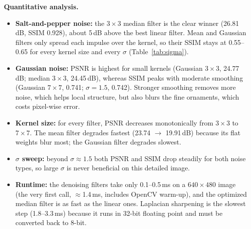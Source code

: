 \documentclass[a4paper,12pt]{article}
\begin{document}
\textbf{Quantitative analysis.}
\begin{itemize}[leftmargin=*]
    \item \textbf{Salt-and-pepper noise:} the $3\times3$ median filter is the clear winner
          (26.81\,dB, SSIM 0.928), about 5\,dB above the best linear filter. Mean and Gaussian
          filters only spread each impulse over the kernel, so their SSIM stays at 0.55--0.65 for
          every kernel size and every $\sigma$ (Table~\ref{tab:sigma}).
    \item \textbf{Gaussian noise:} PSNR is highest for small kernels (Gaussian $3\times3$, 24.77\,dB;
          median $3\times3$, 24.45\,dB), whereas SSIM peaks with moderate smoothing (Gaussian
          $7\times7$, 0.741; $\sigma=1.5$, 0.742). Stronger smoothing removes more noise, which helps
          local structure, but also blurs the fine ornaments, which costs pixel-wise error.
    \item \textbf{Kernel size:} for every filter, PSNR decreases monotonically from $3\times3$ to
          $7\times7$. The mean filter degrades fastest (23.74 $\rightarrow$ 19.91\,dB) because its
          flat weights blur most; the Gaussian filter degrades slowest.
    \item \textbf{$\sigma$ sweep:} beyond $\sigma\approx1.5$ both PSNR and SSIM drop steadily for both
          noise types, so large $\sigma$ is never beneficial on this detailed image.
    \item \textbf{Runtime:} the denoising filters take only 0.1--0.5\,ms on a $640\times480$ image (the
          very first call, $\approx$1.4\,ms, includes OpenCV warm-up), and the optimized median filter
          is as fast as the linear ones. Laplacian sharpening is the slowest step (1.8--3.3\,ms)
          because it runs in 32-bit floating point and must be converted back to 8-bit.
\end{itemize}
\end{document}

